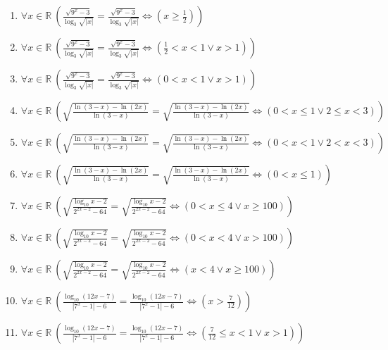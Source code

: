 \documentclass[11pt,a4paper]{article}
\begin{document}
\begin{enumerate}
\item $\displaystyle \forall x \in \mathbb{R}\ \left( \frac{\sqrt{9^{x} - 3}}{\log_{3}\sqrt{\left| x \right|}} = \frac{\sqrt{9^{x} - 3}}{\log_{3}\sqrt{\left| x \right|}} \iff \left( x \ge \frac{1}{2} \right) \right)$
\item $\displaystyle \forall x \in \mathbb{R}\ \left( \frac{\sqrt{9^{x} - 3}}{\log_{3}\sqrt{\left| x \right|}} = \frac{\sqrt{9^{x} - 3}}{\log_{3}\sqrt{\left| x \right|}} \iff \left( \frac{1}{2} < x < 1 \lor x > 1 \right) \right)$
\item $\displaystyle \forall x \in \mathbb{R}\ \left( \frac{\sqrt{9^{x} - 3}}{\log_{3}\sqrt{\left| x \right|}} = \frac{\sqrt{9^{x} - 3}}{\log_{3}\sqrt{\left| x \right|}} \iff \left( 0 < x < 1 \lor x > 1 \right) \right)$
\item $\displaystyle \forall x \in \mathbb{R}\ \left( \sqrt{\frac{\ln(3 - x) - \ln(2x)}{\ln(3 - x)}} = \sqrt{\frac{\ln(3 - x) - \ln(2x)}{\ln(3 - x)}} \iff \left( 0 < x \le 1 \lor 2 \le x < 3 \right) \right)$
\item $\displaystyle \forall x \in \mathbb{R}\ \left( \sqrt{\frac{\ln(3 - x) - \ln(2x)}{\ln(3 - x)}} = \sqrt{\frac{\ln(3 - x) - \ln(2x)}{\ln(3 - x)}} \iff \left( 0 < x < 1 \lor 2 < x < 3 \right) \right)$
\item $\displaystyle \forall x \in \mathbb{R}\ \left( \sqrt{\frac{\ln(3 - x) - \ln(2x)}{\ln(3 - x)}} = \sqrt{\frac{\ln(3 - x) - \ln(2x)}{\ln(3 - x)}} \iff \left( 0 < x \le 1 \right) \right)$
\item $\displaystyle \forall x \in \mathbb{R}\ \left( \sqrt{\frac{\log_{10} x - 2}{2^{2x-2} - 64}} = \sqrt{\frac{\log_{10} x - 2}{2^{2x-2} - 64}} \iff \left( 0 < x \le 4 \lor x \ge 100 \right) \right)$
\item $\displaystyle \forall x \in \mathbb{R}\ \left( \sqrt{\frac{\log_{10} x - 2}{2^{2x-2} - 64}} = \sqrt{\frac{\log_{10} x - 2}{2^{2x-2} - 64}} \iff \left( 0 < x < 4 \lor x > 100 \right) \right)$
\item $\displaystyle \forall x \in \mathbb{R}\ \left( \sqrt{\frac{\log_{10} x - 2}{2^{2x-2} - 64}} = \sqrt{\frac{\log_{10} x - 2}{2^{2x-2} - 64}} \iff \left( x < 4 \lor x \ge 100 \right) \right)$
\item $\displaystyle \forall x \in \mathbb{R}\ \left( \frac{\log_{10}(12x - 7)}{\left| 7^{x} - 1 \right| - 6} = \frac{\log_{10}(12x - 7)}{\left| 7^{x} - 1 \right| - 6} \iff \left( x > \frac{7}{12} \right) \right)$
\item $\displaystyle \forall x \in \mathbb{R}\ \left( \frac{\log_{10}(12x - 7)}{\left| 7^{x} - 1 \right| - 6} = \frac{\log_{10}(12x - 7)}{\left| 7^{x} - 1 \right| - 6} \iff \left( \frac{7}{12} \le x < 1 \lor x > 1 \right) \right)$

\end{enumerate}
\end{document}
